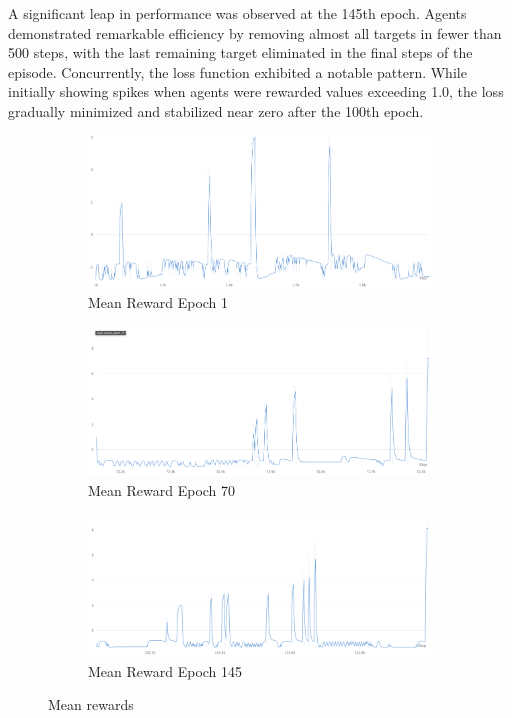 \documentclass{scrartcl}
\begin{document}
A significant leap in performance was observed at the 145th epoch. Agents demonstrated remarkable efficiency by removing almost all targets in fewer than 500 steps, with the last remaining target eliminated in the final steps of the episode. Concurrently, the loss function exhibited a notable pattern. While initially showing spikes when agents were rewarded values exceeding 1.0, the loss gradually minimized and stabilized near zero after the 100th epoch.

\begin{figure}
  \centering
  \begin{subfigure}[b]{0.45\textwidth}
      \centering
      \includegraphics[width=\textwidth]{img/mean_reward_1_epoch.png}
      \caption{Mean Reward Epoch 1}
      \label{fig:s_mer}
  \end{subfigure}
  \hfill
  \begin{subfigure}[b]{0.45\textwidth}
      \centering
      \includegraphics[width=\textwidth]{img/mean_reward_70_epoch.png}
      \caption{Mean Reward Epoch 70}
      \label{fig:s_mel}
  \end{subfigure}
  \hfill
  \begin{subfigure}[b]{0.45\textwidth}
      \centering
      \includegraphics[width=\textwidth]{img/mean_reward_145_epoch.png}
      \caption{Mean Reward Epoch 145} 
      \label{fig:s_ser}
  \end{subfigure}
  \caption{Mean rewards}
  \label{fig:t}
\end{figure}
\end{document}
